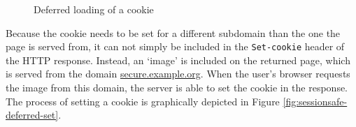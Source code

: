 \begin{figure}[htb]
	\centering
	\caption[Deferred loading of a cookie]{Deferred loading of a cookie \cite{Johns2006}}
\end{figure}

Because the cookie needs to be set for a different subdomain than the one the page is served from, it can not simply be included in the \texttt{Set-cookie} header of the HTTP response. Instead, an `image' is included on the returned page, which is served from the domain \url{secure.example.org}. When the user's browser requests the image from this domain, the server is able to set the cookie in the response. The process of setting a cookie is graphically depicted in Figure \ref{fig:sessionsafe-deferred-set}.

